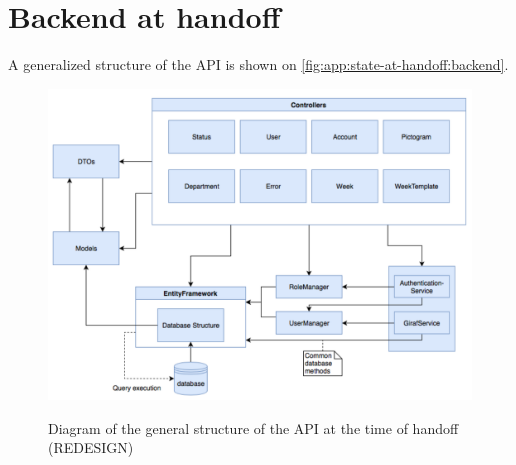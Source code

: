\section{Backend at handoff}\label{app:state-at-handoff:backend}

A generalized structure of the API is shown on \autoref{fig:app:state-at-handoff:backend}.

\begin{figure}[h]
    \centering
    \caption{Diagram of the general structure of the API at the time of handoff (REDESIGN)}
    \includegraphics[width=1\textwidth]{figures/api_gen_struct_ho.png}
    \label{fig:app:state-at-handoff:backend}
\end{figure}